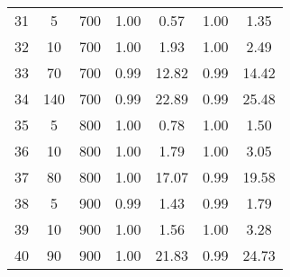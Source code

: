 \documentclass[11pt]{article}
\begin{document}
\begin{table}[]
\begin{tabular}{ccccccc}
			\rowcolor[HTML]{EFEFEF} 
			31 & 5 & 700 & 1.00 & 0.57 & 1.00 & 1.35 \\
			\rowcolor[HTML]{EFEFEF} 
			32 & 10 & 700 & 1.00 & 1.93 & 1.00 & 2.49 \\
			\rowcolor[HTML]{EFEFEF} 
			33 & 70 & 700 & 0.99 & 12.82 & 0.99 & 14.42 \\
			\rowcolor[HTML]{EFEFEF} 
			34 & 140 & 700 & 0.99 & 22.89 & 0.99 & 25.48 \\
			35 & 5 & 800 & 1.00 & 0.78 & 1.00 & 1.50 \\
			36 & 10 & 800 & 1.00 & 1.79 & 1.00 & 3.05 \\
			37 & 80 & 800 & 1.00 & 17.07 & 0.99 & 19.58 \\
			\rowcolor[HTML]{EFEFEF} 
			38 & 5 & 900 & 0.99 & 1.43 & 0.99 & 1.79 \\
			\rowcolor[HTML]{EFEFEF} 
			39 & 10 & 900 & 1.00 & 1.56 & 1.00 & 3.28 \\
			\rowcolor[HTML]{EFEFEF} 
			40 & 90 & 900 & 1.00 & 21.83 & 0.99 & 24.73
		\end{tabular}
	\end{table}
	
\end{document}
